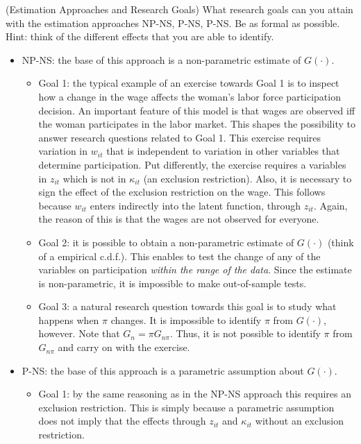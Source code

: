 \begin{exercise} (Estimation Approaches and Research Goals) \label{exercise:approaches}
What research goals can you attain with the estimation approaches NP-NS, P-NS, P-NS. Be as formal as possible. Hint: think of the different effects that you are able to identify.
\begin{itemize}
\item NP-NS: the base of this approach is a non-parametric estimate of $G(\cdot)$.
\begin{itemize}
\item Goal 1: the typical example of an exercise towards Goal 1 is to inspect how a change in the wage affects the woman's labor force participation decision. An important feature of this model is that wages are observed iff the woman participates in the labor market. This shapes the possibility to answer research questions related to Goal 1. This exercise requires variation in $w_{it}$ that is independent to variation in other variables that determine participation. Put differently, the exercise requires a variables in $z_{it}$ which is not in $\kappa_{it}$ (an exclusion restriction). Also, it is necessary to sign the effect of the exclusion restriction on the wage. This follows because $w_{it}$ enters indirectly into the latent function, through $z_{it}$. Again, the reason of this is that the wages are not observed for everyone.   
\item Goal 2: it is possible to obtain a non-parametric estimate of $G(\cdot)$ (think of a empirical c.d.f.). This enables to test the change of any of the variables on participation \emph{within the range of the data}. Since the estimate is non-parametric, it is impossible to make out-of-sample tests.   
\item Goal 3: a natural research question towards this goal is to study what happens when $\pi$ changes. It is impossible to identify $\pi$ from $G(\cdot)$, however. Note that $G_{n} = \pi G_{n \pi}$. Thus, it is not possible to identify $\pi$ from $G_{n \pi}$ and carry on with the exercise.
\end{itemize} 
\item P-NS: the base of this approach is a parametric assumption about $G(\cdot)$.
\begin{itemize}
\item Goal 1: by the same reasoning as in the NP-NS approach this requires an exclusion restriction. This is simply because a parametric assumption does not imply that the effects through $z_{it}$ and $\kappa_{it}$ without an exclusion restriction. 

\end{itemize}
\end{itemize}
\end{exercise}
